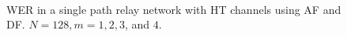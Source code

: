 \begin{figure}
{	 \\
}
\caption{WER in a single path relay network with HT channels using AF and DF.  $N = 128, m = 1, 2, 3$, and $4$.}
\label{fig:sp_af_df_wer_plots_HT}
\end{figure}
